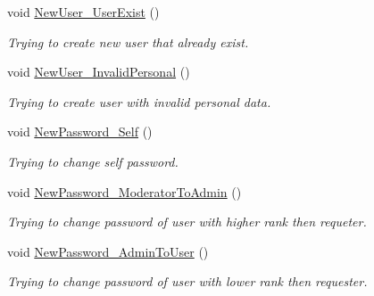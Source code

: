 \begin{DoxyCompactItemize}
void \mbox{\hyperlink{class_authority_controller_1_1_tests_1_1_queries_aa4bfd8884d421a8dfe58a5b7ede3c567}{New\+User\+\_\+\+User\+Exist}} ()
\begin{DoxyCompactList}\small\item\em Trying to create new user that already exist. \end{DoxyCompactList}\item 
void \mbox{\hyperlink{class_authority_controller_1_1_tests_1_1_queries_ae3f994db2b80f9d5fe5251b7d8cacaff}{New\+User\+\_\+\+Invalid\+Personal}} ()
\begin{DoxyCompactList}\small\item\em Trying to create user with invalid personal data. \end{DoxyCompactList}\item 
void \mbox{\hyperlink{class_authority_controller_1_1_tests_1_1_queries_a55ad47988eb2a7c20fc51bf71ca3dced}{New\+Password\+\_\+\+Self}} ()
\begin{DoxyCompactList}\small\item\em Trying to change self password. \end{DoxyCompactList}\item 
void \mbox{\hyperlink{class_authority_controller_1_1_tests_1_1_queries_ad767ebe267fd51e8df5f53c2f0b11f5d}{New\+Password\+\_\+\+Moderator\+To\+Admin}} ()
\begin{DoxyCompactList}\small\item\em Trying to change password of user with higher rank then requeter. \end{DoxyCompactList}\item 
void \mbox{\hyperlink{class_authority_controller_1_1_tests_1_1_queries_ab04b5335b4b693f145631c1bc1d0ab3d}{New\+Password\+\_\+\+Admin\+To\+User}} ()
\begin{DoxyCompactList}\small\item\em Trying to change password of user with lower rank then requester. \end{DoxyCompactList}\end{DoxyCompactItemize}
